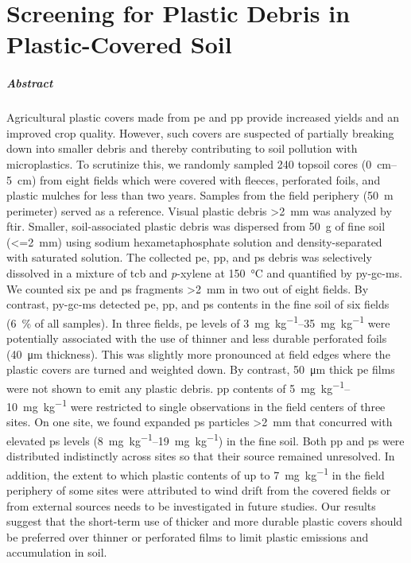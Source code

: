 
\chapter{Screening for Plastic Debris in Plastic-Covered Soil}
\label{ch:screening}

\paragraph{Abstract}
Agricultural plastic covers made from \ac{pe} and \ac{pp} provide increased yields and an improved crop quality. However, such covers are suspected of partially breaking down into smaller debris and thereby contributing to soil pollution with microplastics. To scrutinize this, we randomly sampled 240 topsoil cores (\SIrange{0}{5}{\centi\meter}) from eight fields which were covered with fleeces, perforated foils, and plastic mulches for less than two years. Samples from the field periphery (\SI{50}{\meter} perimeter) served as a reference. Visual plastic debris \SI{>2}{\milli\meter} was analyzed by \ac{ftir}. Smaller, soil-associated plastic debris was dispersed from \SI{50}{\gram} of fine soil (\SI{<=2}{\milli\meter}) using sodium hexametaphosphate solution and density-separated with saturated  solution. The collected \ac{pe}, \ac{pp}, and \ac{ps} debris was selectively dissolved in a mixture of \ac{tcb} and \textit{p}-xylene at \SI{150}{\degreeCelsius} and quantified by \ac{py-gc-ms}. We counted six \ac{pe} and \ac{ps} fragments \SI{>2}{\milli\meter} in two out of eight fields. By contrast, \ac{py-gc-ms} detected \ac{pe}, \ac{pp}, and \ac{ps} contents in the fine soil of six fields (\SI{6}{\percent} of all samples). In three fields, \ac{pe} levels of \SIrange{3}{35}{\milli\gram\per\kilo\gram} were potentially associated with the use of thinner and less durable perforated foils (\SI{40}{\micro\meter} thickness). This was slightly more pronounced at field edges where the plastic covers are turned and weighted down. By contrast, \SI{50}{\micro\meter} thick \ac{pe} films were not shown to emit any plastic debris. \ac{pp} contents of \SIrange{5}{10}{\milli\gram\per\kilo\gram} were restricted to single observations in the field centers of three sites. On one site, we found expanded \ac{ps} particles \SI{>2}{\milli\meter} that concurred with elevated \ac{ps} levels (\SIrange{8}{19}{\milli\gram\per\kilo\gram}) in the fine soil. Both \ac{pp} and \ac{ps} were distributed indistinctly across sites so that their source remained unresolved. In addition, the extent to which plastic contents of up to \SI{7}{\milli\gram\per\kilo\gram} in the field periphery of some sites were attributed to wind drift from the covered fields or from external sources needs to be investigated in future studies. Our results suggest that the short-term use of thicker and more durable plastic covers should be preferred over thinner or perforated films to limit plastic emissions and accumulation in soil.

